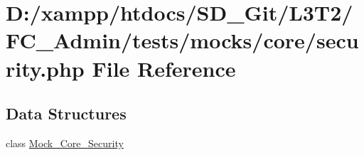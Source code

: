 \hypertarget{_admin_2tests_2mocks_2core_2_security_8php}{}\section{D\+:/xampp/htdocs/\+S\+D\+\_\+\+Git/\+L3\+T2/\+F\+C\+\_\+\+Admin/tests/mocks/core/security.php File Reference}
\label{_admin_2tests_2mocks_2core_2_security_8php}
\subsection*{Data Structures}
\begin{DoxyCompactItemize}
\item 
class \hyperlink{class_mock___core___security}{Mock\+\_\+\+Core\+\_\+\+Security}
\end{DoxyCompactItemize}
